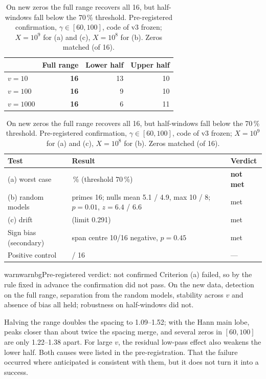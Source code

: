\documentclass[11pt,a4paper]{article}
\begin{document}
\begin{table}[h]
\caption{On new zeros the full range recovers all 16, but half-windows fall below the 70\,\% threshold. Pre-registered confirmation, $\gamma\in[60,100]$, code of v3 frozen; $X=10^9$ for (a) and (c), $X=10^8$ for (b). Zeros matched (of 16).}
\label{tab:prereg}
\centering\sffamily\small
\begin{tabular}{@{}lrrr@{}}
\toprule
 & Full range & Lower half & Upper half\\
\midrule
$v=10$ & \textbf{16} & 13 & 10\\
$v=100$ & \textbf{16} & 9 & 10\\
$v=1000$ & \textbf{16} & 6 & 11\\
\bottomrule
\end{tabular}

\vspace{4mm}
\begin{tabular}{@{}l>{\raggedright\arraybackslash}p{5.4cm}l@{}}
\toprule
Test & Result & Verdict\\
\midrule
(a) worst case & 38\,\% (threshold 70\,\%) & \textbf{not met}\\
(b) random models & primes 16; nulls mean 5.1 / 4.9, max 10 / 8; $p=0.01$, $z=6.4$ / $6.6$ & met\\
(c) drift & 0.234 (limit 0.291) & met\\
Sign bias (secondary) & span centre 10/16 negative, $p=0.45$ & met\\
Positive control & 16 / 16 & ---\\
\bottomrule
\end{tabular}
\end{table}

\begin{notebox}{warn}{warnbg}{Pre-registered verdict: not confirmed}
Criterion (a) failed, so by the rule fixed in advance the confirmation did not pass. On the new data, detection on the full range, separation from the random models, stability across $v$ and absence of bias all held; robustness on half-windows did not.
\end{notebox}

Halving the range doubles the spacing to 1.09--1.52; with the Hann main lobe, peaks closer than about twice the spacing merge, and several zeros in $[60,100]$ are only 1.22--1.38 apart. For large $v$, the residual low-pass effect also weakens the lower half. Both causes were listed in the pre-registration. That the failure occurred where anticipated is consistent with them, but it does not turn it into a success.
\end{document}
